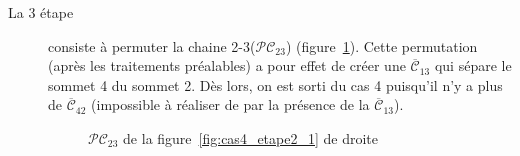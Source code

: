 \begin{description}
\item[La 3 étape] consiste à permuter la chaine 2-3($\mathcal{PC}_{23}$) (figure~\ref{fig:cas4_etape3}).
Cette permutation (après les traitements préalables) a pour effet de créer une $\overline{\mathcal{C}}_{13}$ qui sépare le sommet 4 du sommet 2.
Dès lors, on est sorti du cas 4 puisqu'il n'y a plus de $\overline{\mathcal{C}}_{42}$ (impossible à réaliser de par la présence de la $\overline{\mathcal{C}}_{13}$).
\begin{figure}[!ht]\centering
	\begin{changemargin}{-3cm}{-3cm}
		\begin{center}
			
		\end{center}
		\end{changemargin}
	\begin{changemargin}{3cm}{0cm}
	\caption{$\mathcal{PC}_{23}$ de la figure~\ref{fig:cas4_etape2_1} de droite}\label{fig:cas4_etape3}
\end{changemargin}	
\end{figure}	
\FloatBarrier


\end{description}	
